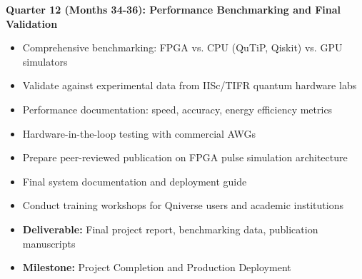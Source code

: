 \documentclass[12pt,a4paper]{article}
\begin{document}
\textbf{Quarter 12 (Months 34-36): Performance Benchmarking and Final Validation}

\begin{itemize}[noitemsep]
\item Comprehensive benchmarking: FPGA vs. CPU (QuTiP, Qiskit) vs. GPU simulators
\item Validate against experimental data from IISc/TIFR quantum hardware labs
\item Performance documentation: speed, accuracy, energy efficiency metrics
\item Hardware-in-the-loop testing with commercial AWGs
\item Prepare peer-reviewed publication on FPGA pulse simulation architecture
\item Final system documentation and deployment guide
\item Conduct training workshops for Qniverse users and academic institutions
\item \textbf{Deliverable:} Final project report, benchmarking data, publication manuscripts
\item \textbf{Milestone:} Project Completion and Production Deployment
\end{itemize}
\end{document}
